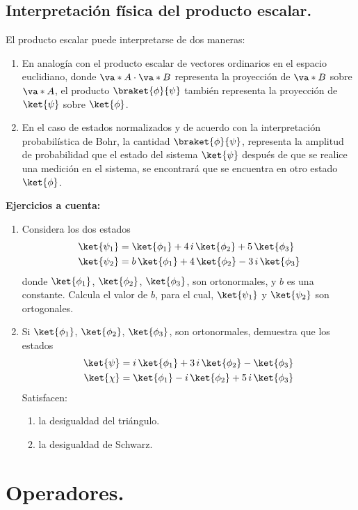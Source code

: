 \subsection*{Interpretación física del producto escalar.}
El producto escalar puede interpretarse de dos maneras:
\begin{enumerate}[label=\arabic*)]
\item En analogía con el producto escalar de vectores ordinarios en el espacio euclidiano, donde $\va*{A} \cdot \va*{B}$ representa la proyección de $\va*{B}$ sobre $\va*{A}$, el producto $\braket{\phi}{\psi}$ también representa la proyección de $\ket{\psi}$ sobre $\ket{\phi}$.
\item En el caso de estados normalizados y de acuerdo con la interpretación probabilística de Bohr, la cantidad $\braket{\phi}{\psi}$, representa la amplitud de probabilidad que el estado del sistema $\ket{\psi}$ después de que se realice una medición en el sistema, se encontrará que se encuentra en otro estado $\ket{\phi}$.
\end{enumerate}
\textbf{Ejercicios a cuenta: }
\begin{enumerate}[label=\roman*)]
\item Considera los dos estados
\begin{align*}
\ket{\psi_{1}} &= \ket{\phi_{1}} + 4 \, i \, \ket{\phi_{2}} + 5 \, \ket{\phi_{3}} \\
\ket{\psi_{2}} &= b \, \ket{\phi_{1}} + 4 \, \ket{\phi_{2}} - 3 \, i \, \ket{\phi_{3}}
\end{align*}
donde $\ket{\phi_{1}}$, $\ket{\phi_{2}}$, $\ket{\phi_{3}}$, son ortonormales, y $b$ es una constante. Calcula el valor de $b$, para el cual, $\ket{\psi_{1}}$ y $\ket{\psi_{2}}$ son ortogonales.
\item Si $\ket{\phi_{1}}$, $\ket{\phi_{2}}$, $\ket{\phi_{3}}$, son ortonormales, demuestra que los estados
\begin{align*}
\ket{\psi} &= i \, \ket{\phi_{1}} + 3 \, i \, \ket{\phi_{2}} - \ket{\phi_{3}} \\
\ket{\chi} &= \ket{\phi_{1}} - i \, \ket{\phi_{2}} + 5 \, i \, \ket{\phi_{3}}
\end{align*}
Satisfacen:
\begin{enumerate}[label=\alph*)]
\item la desigualdad del triángulo.
\item la desigualdad de Schwarz.
\end{enumerate}
\end{enumerate}
\section{Operadores.}
